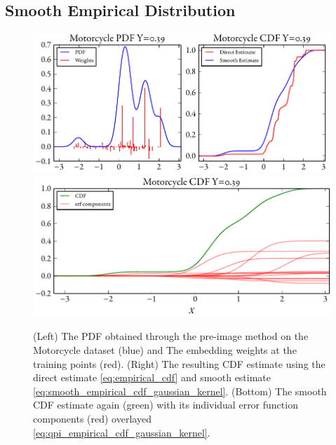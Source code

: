 \documentclass[twoside]{article} \usepackage{aistats2017}
\theoremstyle{definition}
\newcommand{\warn}[1]{{\color{red} #1}}
\begin{document}
	\subsection{Smooth Empirical Distribution}
	\label{sec:discriminative_quantile_regression:smooth_empirical_distribution}

		
		\begin{figure}
			\begin{center}
				\includegraphics[width=\columnwidth]{figures/cumulativeexamplesmooth}
				\includegraphics[width=\columnwidth]{figures/cumulativeexampleerf}
			\end{center}
			\caption{\small (Left) The PDF obtained through the pre-image method on the Motorcycle dataset (blue) and The embedding weights at the training points (red). (Right) The resulting CDF estimate using the direct estimate \eqref{eq:empirical_cdf} and smooth estimate \eqref{eq:smooth_empirical_cdf_gaussian_kernel}. (Bottom) The smooth CDF estimate again (green) with its individual error function components (red) overlayed \eqref{eq:qpi_empirical_cdf_gaussian_kernel}.}
			\label{fig:discriminative_quantile_regression}
		\end{figure}
		
\end{document}
